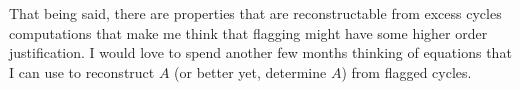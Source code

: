 That being said, there are properties that are reconstructable from excess cycles computations that make me think that flagging might have some higher order justification.
I would love to spend another few months thinking of equations that I can use to reconstruct $A$ (or better yet, determine $A$) from flagged cycles.

